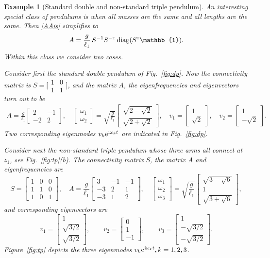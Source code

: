 \documentclass[12pt]{article}
\makeatletter
\newcommand{\T}{\textsc{t}}
\newcommand{\mi}{\hspace{.4pt}\mathrm{i}}
\newcommand{\e}{\hspace{.4pt}\mathrm{e}}
\theoremstyle{sfdefinition}%
\theoremstyle{sfdefinition}
\newtheorem{example}[lemma]{Example}
\def\@Endofsymbol{\decosix}
\def\Endoftheorem{\@endgadget{\@Endofsymbol}}
\newcommand{\mymatrix}[1]{\begin{bmatrix} #1 \end{bmatrix}}
\newcommand{\smat}[1]{\bigl[\begin{smallmatrix} #1 
                            \end{smallmatrix}\bigr]}
\newcommand{\one}{\mathbb{1}}
\DeclareMathOperator{\diag}{diag}
\makeatother
\begin{document}
\begin{example}[Standard double and non-standard triple pendulum]\label{ex:dtp}
  An interesting special class of pendulums is when all masses are the 
  same and all lengths are the same. Then \eqref{AAis} simplifies to 
  \[
    A=\frac{g}{\ell_1}\, S^{-1}S^{-\T}\diag(S^{\T}\one). 
  \]
  Within this class we consider two cases. 

  Consider first the standard double pendulum of Fig.~\ref{fig:dp}. 
  Now the connectivity matrix is $S=\smat{1&0\\1&1}$, and the matrix 
  $A$, the eigenfrequencies and eigenvectors turn out to be 
  \begin{align*}
    A = \frac{g}{\ell_1}\mymatrix{2&-1\\-2&2}, 
    \quad 
    \mymatrix{\omega_1\\\omega_2}
    =\sqrt{\frac{g}{\ell_1}}
       \mymatrix{\sqrt{2-\sqrt2}\\ \sqrt{2+\sqrt2}}, 
    \quad 
     v_1 =\mymatrix{1\\\sqrt2}, \quad 
     v_2 =\mymatrix{1\\-\sqrt2}. 
  \end{align*}
  Two corresponding eigenmodes $v_k\e^{\mi\omega_k t}$
  are indicated in Fig.~\ref{fig:dp}. 

  Consider next the \emph{non}-standard triple pendulum whose three 
  arms all connect at $z_1$, see Fig.~\ref{fig:tp}(b). The 
  connectivity matrix $S$, the matrix $A$ and eigenfrequencies are 
  \[
    S=\mymatrix{1&0&0\\1&1&0\\1&0&1}, 
    \quad 
    A=\frac{g}{\ell_1}\mymatrix{3&-1&-1\\-3&2&1\\-3&1&2}, 
    \quad 
    \mymatrix{\omega_1\\ \omega_2\\ \omega_3}
    =\sqrt{\frac{g}{\ell_1}} \mymatrix{\sqrt{3-\sqrt6}\\ 1\\ \sqrt{3+\sqrt6}}, 
  \]
  and corresponding eigenvectors are 
  \[
     v_1=\mymatrix{1\\ \sqrt{3/2}\\ \sqrt{3/2}},\qquad 
     v_2=\mymatrix{0\\ 1\\ -1},\qquad 
     v_3=\mymatrix{1\\ -\sqrt{3/2}\\ -\sqrt{3/2}}. 
  \]
  Figure~\ref{fig:tp} depicts the three eigenmodes 
  $v_k\e^{\mi\omega_k t}, k=1,2,3$.  \Endoftheorem 
\end{example}



\end{document}
